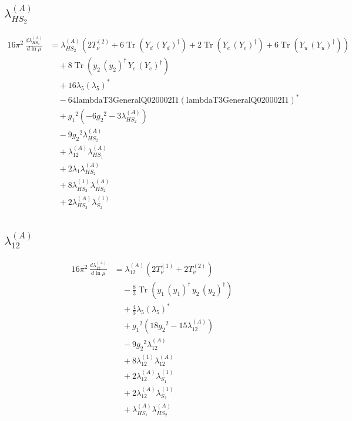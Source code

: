 \documentclass[10pt,a4paper]{article}
\begin{document}
\subsection*{$\lambda_{HS_2}^{(A)}$}
\begin{align*}
16\pi^2\,\frac{d \lambda_{HS_2}^{(A)}}{d\ln\mu} &={\lambda_{HS_2}^{(A)}} (2 T_{\nu}^{(2)}+6 \operatorname{Tr}\!\left({Y_d}\,\left({Y_d}\right)^{\dagger}\right)+2 \operatorname{Tr}\!\left({Y_e}\,\left({Y_e}\right)^{\dagger}\right)+6 \operatorname{Tr}\!\left({Y_u}\,\left({Y_u}\right)^{\dagger}\right)) \\
&\quad +8 \operatorname{Tr}\!\left({y_2}\,\left({y_2}\right)^{\dagger}\,{Y_e}\,\left({Y_e}\right)^{\dagger}\right) \\
&\quad +16 {\lambda_5} \left({\lambda_5}\right)^{*} \\
&\quad -64 \text{lambdaT3GeneralQ020002I1} \left(\text{lambdaT3GeneralQ020002I1}\right)^{*} \\
&\quad +{g_1}^2 \left(-6 {g_2}^2-3 {\lambda_{HS_2}^{(A)}}\right) \\
&\quad -9 {g_2}^2 {\lambda_{HS_2}^{(A)}} \\
&\quad +{\lambda_{12}^{(A)}} {\lambda_{HS_1}^{(A)}} \\
&\quad +2 {\lambda_1} {\lambda_{HS_2}^{(A)}} \\
&\quad +8 {\lambda_{HS_2}^{(1)}} {\lambda_{HS_2}^{(A)}} \\
&\quad +2 {\lambda_{HS_2}^{(A)}} {\lambda_{S_2}^{(1)}} \\
\end{align*}
\subsection*{$\lambda_{12}^{(A)}$}
\begin{align*}
16\pi^2\,\frac{d \lambda_{12}^{(A)}}{d\ln\mu} &={\lambda_{12}^{(A)}} (2 T_{\nu}^{(1)}+2 T_{\nu}^{(2)}) \\
&\quad -\frac{8}{3} \operatorname{Tr}\!\left({y_1}\,\left({y_1}\right)^{\dagger}\,{y_2}\,\left({y_2}\right)^{\dagger}\right) \\
&\quad +\frac{4}{3} {\lambda_5} \left({\lambda_5}\right)^{*} \\
&\quad +{g_1}^2 \left(18 {g_2}^2-15 {\lambda_{12}^{(A)}}\right) \\
&\quad -9 {g_2}^2 {\lambda_{12}^{(A)}} \\
&\quad +8 {\lambda_{12}^{(1)}} {\lambda_{12}^{(A)}} \\
&\quad +2 {\lambda_{12}^{(A)}} {\lambda_{S_1}^{(1)}} \\
&\quad +2 {\lambda_{12}^{(A)}} {\lambda_{S_2}^{(1)}} \\
&\quad +{\lambda_{HS_1}^{(A)}} {\lambda_{HS_2}^{(A)}} \\
\end{align*}
\end{document}
